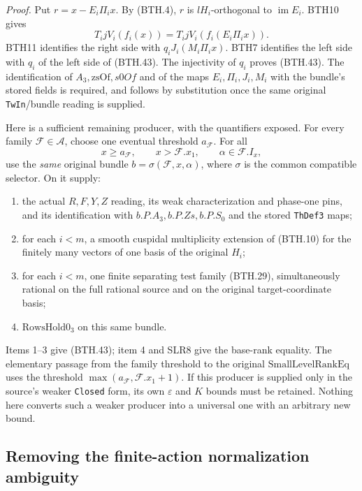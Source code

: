 \emph{Proof.}
Put \(r=x-E_i\Pi_i x\).
By (BTH.4), \(r\) is \(lH_i\)-orthogonal to
\(\operatorname{im}E_i\).  BTH10 gives
\[
       T_i jV_i(f_i(x))
             =T_i jV_i(f_i(E_i\Pi_i x)).
\]
BTH11 identifies the right side with
\(q_iJ_i(M_i\Pi_i x)\).  BTH7 identifies the left
side with \(q_i\) of the left side of (BTH.43).
The injectivity of \(q_i\) proves (BTH.43).
The identification of \(A_3,\mathrm{zsOf},s0Of\) and of
the maps \(E_i,\Pi_i,J_i,M_i\) with the bundle's stored fields is
required, and follows by substitution once the
same original \texttt{Tw\allowbreak In}/bundle reading is supplied.

Here is a sufficient remaining producer, with the
quantifiers exposed.  For every family
\(\mathcal F\in\mathcal A\), choose one eventual
threshold \(a_\mathcal F\).  For all
\[
  x\ge a_\mathcal F,\qquad x>\mathcal F.x_1,\qquad
           \alpha\in\mathcal F.I_x,                             \tag{BTH.44}
\]
use the \emph{same} original bundle
\(b=\sigma(\mathcal F,x,\alpha)\), where \(\sigma\)
is the common compatible selector.  On it supply:

\begin{enumerate}
 \item the actual \(R,F,Y,Z\) reading, its weak
       characterization and phase-one pins, and its
       identification with \(b.P.A_3,b.P.Zs,b.P.S_0\)
       and the stored \texttt{Th\allowbreak Def3} maps;
 \item for each \(i<m\), a smooth cuspidal
       multiplicity extension of (BTH.10) for the
       finitely many vectors of one basis of the
       original \(H_i\);
 \item for each \(i<m\), one finite separating
       test family (BTH.29), simultaneously rational
       on the full rational source and on the
       original target-coordinate basis;
 \item \(\mathrm{RowsHold0}_3\) on this same bundle.
\end{enumerate}

Items 1--3 give (BTH.43); item 4 and SLR8 give
the base-rank equality.  The elementary passage
from the family threshold to the original
\(\mathrm{SmallLevelRankEq}\) uses the threshold
\(\max(a_\mathcal F,\mathcal F.x_1+1)\).
If this producer is supplied only in the source's
weaker \texttt{Closed} form, its own \(\varepsilon\)
and \(K\) bounds must be retained.  Nothing here
converts such a weaker producer into a universal
one with an arbitrary new bound.

\subsection*{Removing the finite-action normalization ambiguity}

